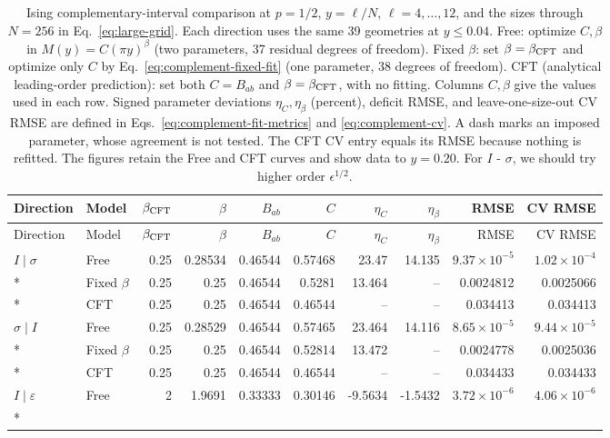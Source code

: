 \begin{longtable}{llrrrrrrrr}
\caption{Ising complementary-interval comparison at $p=1/2$, $y=\ell/N$, $\ell=4,\ldots,12$, and the sizes through $N=256$ in Eq.~\eqref{eq:large-grid}. Each direction uses the same 39 geometries at $y\leq0.04$. Free: optimize $C,\beta$ in $M(y)=C(\pi y)^\beta$ (two parameters, 37 residual degrees of freedom). Fixed $\beta$: set $\beta=\beta_{\rm CFT}$ and optimize only $C$ by Eq.~\eqref{eq:complement-fixed-fit} (one parameter, 38 degrees of freedom). CFT (analytical leading-order prediction): set both $C=B_{ab}$ and $\beta=\beta_{\rm CFT}$, with no fitting. Columns $C,\beta$ give the values used in each row. Signed parameter deviations $\eta_C,\eta_\beta$ (percent), deficit RMSE, and leave-one-size-out CV RMSE are defined in Eqs.~\eqref{eq:complement-fit-metrics} and \eqref{eq:complement-cv}. A dash marks an imposed parameter, whose agreement is not tested. The CFT CV entry equals its RMSE because nothing is refitted. The figures retain the Free and CFT curves and show data to $y=0.20$. For $I$ - $\sigma$, we should try higher order $\epsilon^{1/2}$.}
\label{tab:ising-complement-fits}\\\toprule
Direction & Model & $\beta_{\rm CFT}$ & $\beta$ & $B_{ab}$ & $C$ & $\eta_C$ & $\eta_\beta$ & RMSE & CV RMSE\\\midrule\endfirsthead
\toprule
Direction & Model & $\beta_{\rm CFT}$ & $\beta$ & $B_{ab}$ & $C$ & $\eta_C$ & $\eta_\beta$ & RMSE & CV RMSE\\\midrule\endhead
\bottomrule\endfoot
$I\mid \sigma$ & Free & 0.25 & 0.28534 & 0.46544 & 0.57468 & 23.47 & 14.135 & $9.37\!\times\!10^{-5}$ & $1.02\!\times\!10^{-4}$\\*
 & Fixed $\beta$ & 0.25 & 0.25 & 0.46544 & 0.5281 & 13.464 & -- & 0.0024812 & 0.0025066\\*
 & CFT & 0.25 & 0.25 & 0.46544 & 0.46544 & -- & -- & 0.034413 & 0.034413\\
\addlinespace[3pt]
$\sigma\mid I$ & Free & 0.25 & 0.28529 & 0.46544 & 0.57465 & 23.464 & 14.116 & $8.65\!\times\!10^{-5}$ & $9.44\!\times\!10^{-5}$\\*
 & Fixed $\beta$ & 0.25 & 0.25 & 0.46544 & 0.52814 & 13.472 & -- & 0.0024778 & 0.0025036\\*
 & CFT & 0.25 & 0.25 & 0.46544 & 0.46544 & -- & -- & 0.034433 & 0.034433\\
\addlinespace[3pt]
$I\mid \varepsilon$ & Free & 2 & 1.9691 & 0.33333 & 0.30146 & -9.5634 & -1.5432 & $3.72\!\times\!10^{-6}$ & $4.06\!\times\!10^{-6}$\\*

\end{longtable}

